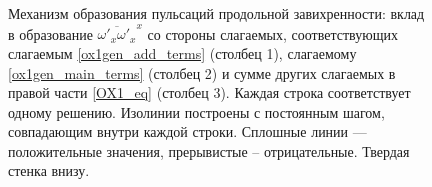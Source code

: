 \begin{figure}
\caption{Механизм образования пульсаций продольной завихренности: вклад в образование $\overline{\omega'_x\omega'_x}^x$ со стороны слагаемых, соответствующих слагаемым \eqref{ox1gen_add_terms} (столбец 1), слагаемому \eqref{ox1gen_main_terms} (столбец 2) и сумме других слагаемых в правой части \eqref{OX1_eq} (столбец 3). Каждая строка соответствует одному решению. Изолинии построены с постоянным шагом, совпадающим внутри каждой строки. Сплошные линии --- положительные значения, прерывистые -- отрицательные. Твердая стенка внизу. }
\label{ductTW_ox1gen_pic}
\end{figure}

